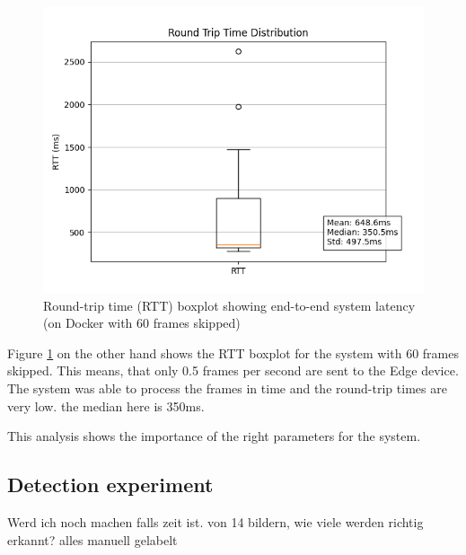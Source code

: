 \documentclass[conference]{IEEEtran}
\begin{document}
\begin{figure}[!h]
    \centering
    \includegraphics[width=1\linewidth]{./res/rtt_distribution-docker_test-60skip.png}
    \caption{Round-trip time (RTT) boxplot showing end-to-end system latency (on Docker with 60 frames skipped)}
    \label{fig:rtt_distribution_docker60}
\end{figure}

Figure \ref{fig:rtt_distribution_docker60} on the other hand shows the RTT boxplot for the system with 60 frames skipped. This means, that only 0.5 frames per second are sent to the Edge device. The system was able to process the frames in time and the round-trip times are very low. the median here is 350ms. 

This analysis shows the importance of the right parameters for the system. 




\subsection{Detection experiment}
\label{sec:detection_experiment}
Werd ich noch machen falls zeit ist. von 14 bildern, wie viele werden richtig erkannt? alles manuell gelabelt
\end{document}

